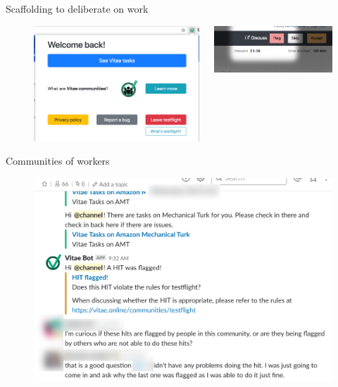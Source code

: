 \documentclass[../presentation]{subfiles}
\begin{document}
\begin{frame}{Scaffolding to deliberate on work}
\begin{figure}
  \begin{columns}
  \begin{column}{0.45\textwidth}
  \includegraphics[width=\textwidth]{../common_figures/vitae/extension_popup.png}
  \end{column}
  \begin{column}[c]{0.45\textwidth}
  \includegraphics[width=\textwidth]{../common_figures/vitae/flagging.png}
  \end{column}
  \end{columns}
  \end{figure}
\end{frame}

\begin{frame}[b]{Communities of workers}
\vspace{2em}
\begin{figure}
  \includegraphics[width=.6\textwidth]{../common_figures/vitae/discussion.png}
  \end{figure}
\end{frame}
\end{document}
